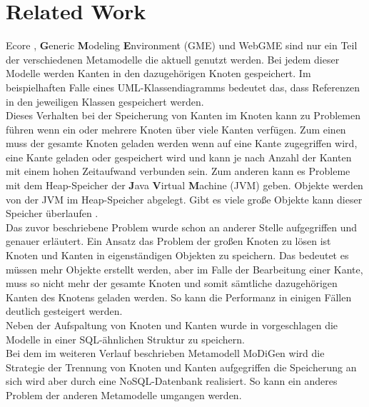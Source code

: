 \section{Related Work}
Ecore \cite{steinberg2008emf}, \textbf{G}eneric \textbf{M}odeling \textbf{E}nvironment (GME) \cite{ledeczi2001generic} und WebGME \cite{maroti2014online} sind nur ein Teil der verschiedenen Metamodelle die aktuell genutzt werden. Bei jedem dieser Modelle werden Kanten in den dazugehörigen Knoten gespeichert. Im beispielhaften Falle eines UML-Klassendiagramms bedeutet das, dass Referenzen in den jeweiligen Klassen gespeichert werden.\\
Dieses Verhalten bei der Speicherung von Kanten im Knoten kann zu Problemen führen wenn ein oder mehrere Knoten über viele Kanten verfügen. Zum einen muss der gesamte Knoten geladen werden wenn auf eine Kante zugegriffen wird, eine Kante geladen oder gespeichert wird und kann je nach Anzahl der Kanten mit einem hohen Zeitaufwand verbunden sein. Zum anderen kann es Probleme mit dem Heap-Speicher der \textbf{J}ava \textbf{V}irtual \textbf{M}achine (JVM) geben. Objekte werden von der JVM im Heap-Speicher abgelegt. Gibt es viele große Objekte kann dieser Speicher überlaufen \cite{Chen2005EFF}.\\
Das zuvor beschriebene Problem wurde schon an anderer Stelle \cite{scheidgen2013reference} aufgegriffen und genauer erläutert. Ein Ansatz das Problem der großen Knoten zu lösen ist Knoten und Kanten in eigenständigen Objekten zu speichern. Das bedeutet es müssen mehr Objekte erstellt werden, aber im Falle der Bearbeitung einer Kante, muss so nicht mehr der gesamte Knoten und somit sämtliche dazugehörigen Kanten des Knotens geladen werden. So kann die Performanz in einigen Fällen deutlich gesteigert werden.\\
Neben der Aufspaltung von Knoten und Kanten wurde in \cite{scheidgen2013reference} vorgeschlagen die Modelle in einer SQL-ähnlichen Struktur zu speichern.\\ 
Bei dem im weiteren Verlauf beschrieben Metamodell MoDiGen wird die Strategie der Trennung von Knoten und Kanten aufgegriffen die Speicherung an sich wird aber durch eine NoSQL-Datenbank realisiert. So kann ein anderes Problem der anderen Metamodelle umgangen werden.

